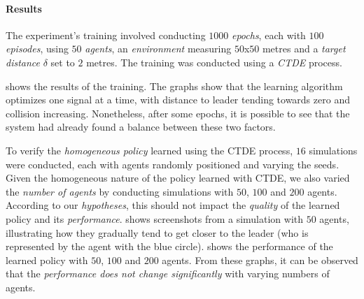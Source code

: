 \documentclass[12pt,a4paper,openright,twoside]{book}
\begin{document}
\paragraph{Results}
The experiment's training involved conducting $1000$ \emph{epochs}, each with $100$ \emph{episodes}, 
    using $50$ \emph{agents}, an \emph{environment} measuring $50$x$50$ metres and a \emph{target distance} $\delta$ set to $2$ metres.
    The training was conducted using a \emph{CTDE} process.

 shows the results of the training. The graphs show that the learning algorithm optimizes one signal 
    at a time, with distance to leader tending towards zero and collision increasing. Nonetheless, after some epochs, 
    it is possible to see that the system had already found a balance between these two factors.

To verify the \emph{homogeneous policy} learned using the CTDE process, $16$ simulations were conducted, each with agents randomly
    positioned and varying the seeds. Given the homogeneous nature of the policy learned with CTDE, we also varied the 
    \emph{number of agents} by conducting simulations with $50$, $100$ and $200$ agents. According to our \emph{hypotheses}, this
    should not impact the \emph{quality} of the learned policy and its \emph{performance}.  shows 
    screenshots from a simulation with $50$ agents, illustrating how they gradually tend to get closer to the leader 
    (who is represented by the agent with the blue circle).  shows the performance of the learned policy with $50$,
    $100$ and $200$ agents. From these graphs, it can be observed that the \emph{performance does not change significantly} with varying
    numbers of agents.
\end{document}

